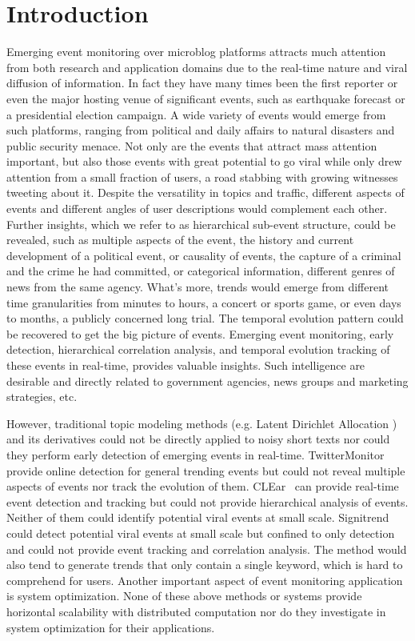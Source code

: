\section{Introduction}

Emerging event monitoring over microblog platforms attracts much attention from both research and application domains due to the real-time nature and viral diffusion of information.
In fact they have many times been the first reporter or even the major hosting venue of significant events, such as earthquake forecast or a presidential election campaign.
A wide variety of events would emerge from such platforms, ranging from political and daily affairs to natural disasters and public security menace.
Not only are the events that attract mass attention important, but also those events with great potential to go viral while only drew attention from a small fraction of users, \eg a road stabbing with growing witnesses tweeting about it.
Despite the versatility in topics and traffic, different aspects of events and different angles of user descriptions would complement each other.
Further insights, which we refer to as hierarchical sub-event structure, could be revealed, such as multiple aspects of the event, \eg the history and current development of a political event, or causality of events, \eg the capture of a criminal and the crime he had committed, or categorical information, \eg different genres of news from the same agency.
What's more, trends would emerge from different time granularities from minutes to hours, \eg a concert or sports game, or even days to months, \eg a publicly concerned long trial.
The temporal evolution pattern could be recovered to get the big picture of events.
Emerging event monitoring, \ie early detection, hierarchical correlation analysis, and temporal evolution tracking of these events in real-time, provides valuable insights. %
Such intelligence are desirable and directly related to government agencies, news groups and marketing strategies, etc.

However, traditional topic modeling methods (e.g. Latent Dirichlet Allocation%
) and its derivatives could not be directly applied to noisy short texts nor could they perform early detection of emerging events in real-time.
TwitterMonitor~\cite{ mathioudakis2010twittermonitor} provide online detection for general trending events but could not reveal multiple aspects of events nor track the evolution of them.
CLEar~\cite{xie2014clear} can provide real-time event detection and tracking but could not provide hierarchical analysis of events.
Neither of them could identify potential viral events at small scale.
Signitrend~\cite{schubert2014signitrend} could detect potential viral events at small scale but confined to only detection and could not provide event tracking and correlation analysis.
The method would also tend to generate trends that only contain a single keyword, which is hard to comprehend for users.
Another important aspect of event monitoring application is system optimization.
None of these above methods or systems provide horizontal scalability with distributed computation nor do they investigate in system optimization for their applications.


